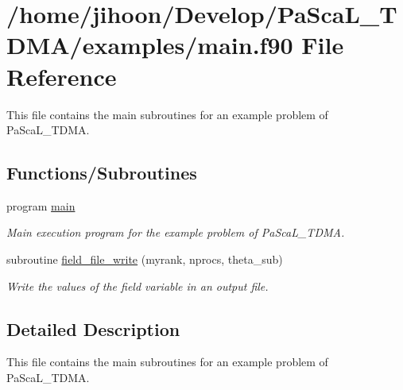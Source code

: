 \hypertarget{main_8f90}{}\section{/home/jihoon/\+Develop/\+Pa\+Sca\+L\+\_\+\+T\+D\+M\+A/examples/main.f90 File Reference}
\label{main_8f90}


This file contains the main subroutines for an example problem of Pa\+Sca\+L\+\_\+\+T\+D\+MA.  


\subsection*{Functions/\+Subroutines}
\begin{DoxyCompactItemize}
\item 
program \hyperlink{main_8f90_a8ec2266d83cd6c0b762cbcbc92c0af3d}{main}
\begin{DoxyCompactList}\small\item\em Main execution program for the example problem of Pa\+Sca\+L\+\_\+\+T\+D\+MA. \end{DoxyCompactList}\item 
subroutine \hyperlink{main_8f90_af0a1310807f21ee1a2c0fdf14c58b63b}{field\+\_\+file\+\_\+write} (myrank, nprocs, theta\+\_\+sub)
\begin{DoxyCompactList}\small\item\em Write the values of the field variable in an output file. \end{DoxyCompactList}\end{DoxyCompactItemize}


\subsection{Detailed Description}
This file contains the main subroutines for an example problem of Pa\+Sca\+L\+\_\+\+T\+D\+MA. 

